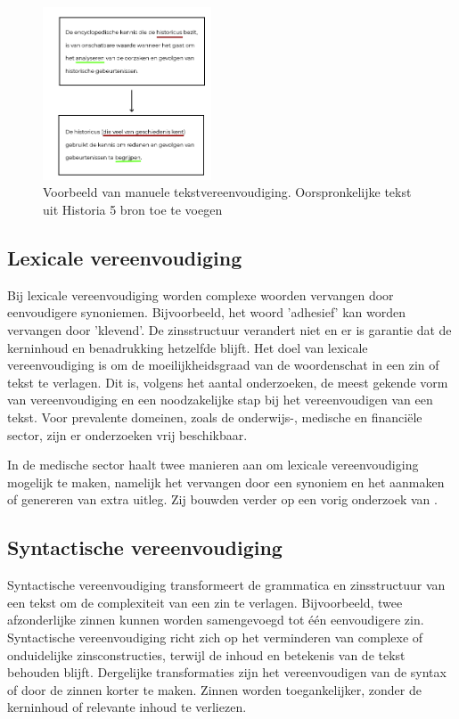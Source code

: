 \begin{figure}
	\begin{center}
			\includegraphics[width=5cm]{img/voorbeeld-manuele-vereenvoudiging.png}
	\end{center}
	\caption{Voorbeeld van manuele tekstvereenvoudiging. Oorspronkelijke tekst uit Historia 5 bron toe te voegen}
\end{figure}

\subsection{Lexicale vereenvoudiging}

Bij lexicale vereenvoudiging worden complexe woorden vervangen door eenvoudigere synoniemen. Bijvoorbeeld, het woord 'adhesief' kan worden vervangen door 'klevend'. De zinsstructuur verandert niet en er is garantie dat de kerninhoud en benadrukking hetzelfde blijft. Het doel van lexicale vereenvoudiging is om de moeilijkheidsgraad van de woordenschat in een zin of tekst te verlagen. Dit is, volgens het aantal onderzoeken, de meest gekende vorm van vereenvoudiging en een noodzakelijke stap bij het vereenvoudigen van een tekst. Voor prevalente domeinen, zoals de onderwijs-, medische en financiële sector, zijn er onderzoeken vrij beschikbaar. 

In de medische sector haalt \textcite{Kandula2010} twee manieren aan om lexicale vereenvoudiging mogelijk te maken, namelijk het vervangen door een synoniem en het aanmaken of genereren van extra uitleg. Zij bouwden verder op een vorig onderzoek van \textcite{Zeng2005}.

\subsection{Syntactische vereenvoudiging}

Syntactische vereenvoudiging transformeert de grammatica en zinsstructuur van een tekst om de complexiteit van een zin te verlagen. Bijvoorbeeld, twee afzonderlijke zinnen kunnen worden samengevoegd tot één eenvoudigere zin. Syntactische vereenvoudiging richt zich op het verminderen van complexe of onduidelijke zinsconstructies, terwijl de inhoud en betekenis van de tekst behouden blijft. Dergelijke transformaties zijn het vereenvoudigen van de syntax of door de zinnen korter te maken. Zinnen worden toegankelijker, zonder de kerninhoud of relevante inhoud te verliezen.

